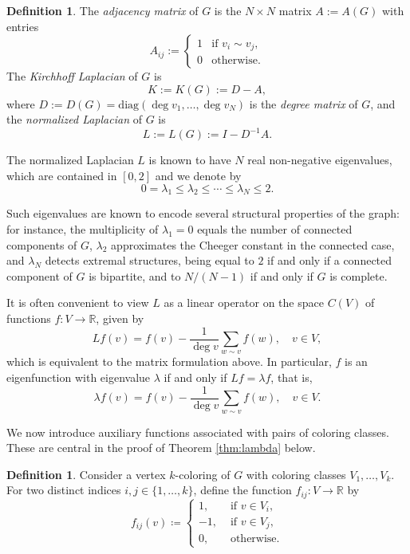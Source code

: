 \documentclass{article}
\newcommand{\R}{\mathbb{R}}
\theoremstyle{plain}
\theoremstyle{definition}
\newtheorem{definition}[theorem]{Definition}
\theoremstyle{remark}
\begin{document}
\begin{definition}
The \emph{adjacency matrix} of $G$ is the $N\times N$ matrix $A:=A(G)$ with entries
$$
A_{ij} :=
\begin{cases}
1 & \text{if } v_i\sim v_j,\\
0 & \text{otherwise.}
\end{cases}
$$
The \emph{Kirchhoff Laplacian} of $G$ is
$$
K:=K(G):=D-A,
$$
where $D:=D(G)=\mathrm{diag}(\deg v_1,\ldots,\deg v_N)$ is the \emph{degree matrix} of $G$, and the \emph{normalized Laplacian} of $G$ is
$$
L:=L(G):=I-D^{-1}A.
$$
\end{definition}

The normalized Laplacian $L$ is known to have $N$ real non-negative eigenvalues, which are contained in $[0,2]$ and we denote by
$$
0=\lambda_1\leq \lambda_2 \leq \cdots \leq \lambda_N \leq 2.
$$

Such eigenvalues are known to encode several structural properties of the graph: for instance, the multiplicity of $\lambda_1=0$ equals the number of connected components of $G$, $\lambda_2$ approximates the Cheeger constant in the connected case, and $\lambda_N$ detects extremal structures, being equal to $2$ if and only if a connected component of $G$ is bipartite, and to $N/(N-1)$ if and only if $G$ is complete. \newline 

It is often convenient to view $L$ as a linear operator on the space $C(V)$ of functions $f:V\to\mathbb{R}$, given by
$$
Lf(v) = f(v) - \frac{1}{\deg v}\sum_{w\sim v} f(w), \quad v\in V,
$$
which is equivalent to the matrix formulation above. In particular, $f$ is an eigenfunction with eigenvalue $\lambda$ if and only if $Lf=\lambda f$, that is,
\begin{equation}\label{eq:eigenpair}
    \lambda f(v) = f(v) - \frac{1}{\deg v}\sum_{w\sim v} f(w), \quad v\in V.
\end{equation}

We now introduce auxiliary functions associated with pairs of coloring classes. These are central in the proof of Theorem \ref{thm:lambda} below.

\begin{definition}\label{def:f_ij}
   Consider a vertex $k$-coloring of $G$ with coloring classes $V_1,\ldots,V_k$. For two distinct indices $i,j\in\{1,\ldots,k\}$, define the function $f_{ij}\colon V\to\R$ by
    \[
    f_{ij}(v) \coloneqq \begin{cases}
        1, &\text{ if } v\in V_i,\\
        -1, &\text{ if } v\in V_j,\\
        0, &\text{ otherwise.}
    \end{cases}
    \]
\end{definition}
\end{document}
